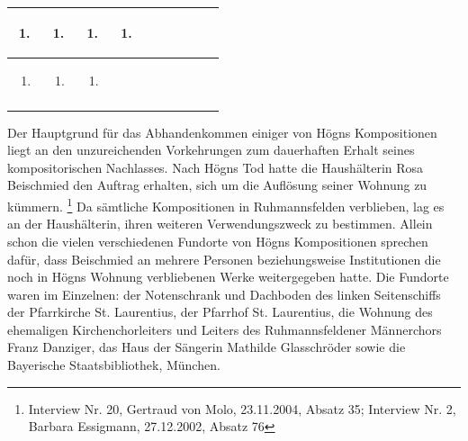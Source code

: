 \documentclass[a4paper]{article}
\begin{document}
\begin{center}
\begin{minipage}{8.096cm}
\begin{flushleft}
\begin{supertabular}{|m{0.60800004cm}|m{0.60800004cm}|m{0.60800004cm}|m{0.60800004cm}|m{0.60800004cm}|m{0.60800004cm}|m{0.60800004cm}|m{0.60800004cm}|m{0.60800004cm}|m{0.626cm}|}
\begin{enumerate}
\item
\end{enumerate}
 &
\begin{enumerate}
\item
\end{enumerate}
 &
\begin{enumerate}
\item
\end{enumerate}
 &
\begin{enumerate}
\item
\end{enumerate}
\\\hline
\begin{enumerate}
\item
\end{enumerate}
 &
\begin{enumerate}
\item
\end{enumerate}
 &
\begin{enumerate}
\item
\end{enumerate}
 &
\\\hhline{---~~~~~~~}
\end{supertabular}
\end{flushleft}
\end{minipage}
\end{center}
Der Hauptgrund für das Abhandenkommen einiger von Högns Kompositionen
liegt an den unzureichenden Vorkehrungen zum dauerhaften Erhalt seines
kompositorischen Nachlasses. Nach Högns Tod hatte die Haushälterin Rosa
Beischmied den Auftrag erhalten, sich um die Auflösung seiner Wohnung
zu kümmern. \footnote{Interview Nr. 20, Gertraud von Molo, 23.11.2004,
Absatz 35; Interview Nr. 2, Barbara Essigmann, 27.12.2002, Absatz 76}
Da sämtliche Kompositionen in Ruhmannsfelden verblieben, lag es an der
Haushälterin, ihren weiteren Verwendungszweck zu bestimmen. Allein
schon die vielen verschiedenen Fundorte von Högns Kompositionen
sprechen dafür, dass Beischmied an mehrere Personen beziehungsweise
Institutionen die noch in Högns Wohnung verbliebenen Werke
weitergegeben hatte. Die Fundorte waren im Einzelnen: der Notenschrank
und Dachboden des linken Seitenschiffs der Pfarrkirche St. Laurentius,
der Pfarrhof St. Laurentius, die Wohnung des ehemaligen
Kirchenchorleiters und Leiters des Ruhmannsfeldener Männerchors Franz
Danziger, das Haus der Sängerin Mathilde Glasschröder sowie die
Bayerische Staatsbibliothek, München.
\end{document}
